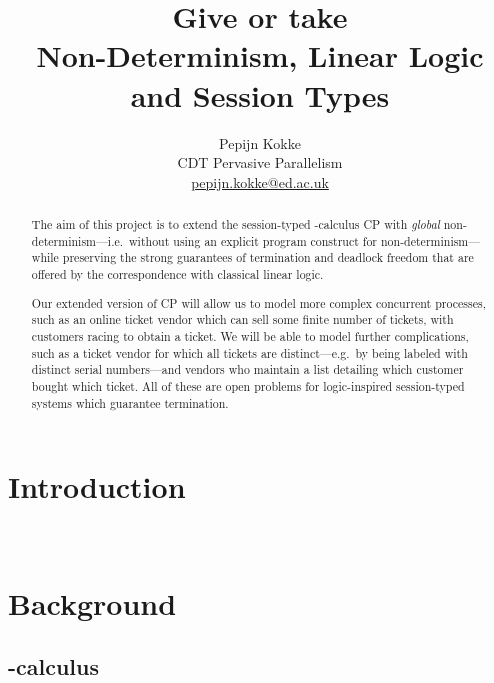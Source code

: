 \documentclass[twocolumn]{article}
\title{Give or take \\
  {\large Non-Determinism, Linear Logic and Session Types}}
\author{Pepijn Kokke \\
  CDT Pervasive Parallelism \\
  \url{pepijn.kokke@ed.ac.uk}}
\begin{document}
\maketitle

\begin{abstract}
  The aim of this project is to extend the session-typed \textpi-calculus CP
  \citep{wadler2012} with \emph{global} non-determinism---i.e.\ without using an
  explicit program construct for non-determinism---while preserving the strong
  guarantees of termination and deadlock freedom that are offered by the
  correspondence with classical linear logic. 
  
  Our extended version of CP will allow us to model more complex concurrent
  processes, such as an online ticket vendor which can sell some finite number
  of tickets, with customers racing to obtain a ticket.
  We will be able to model further complications, such as a ticket vendor for
  which all tickets are distinct---e.g.\ by being labeled with distinct serial
  numbers---and vendors who maintain a list detailing which customer bought
  which ticket.
  All of these are open problems for logic-inspired session-typed systems which
  guarantee termination.
\end{abstract}

\section{Introduction}
\\

\section{Background}

\subsection{\textPi-calculus}
\end{document}
